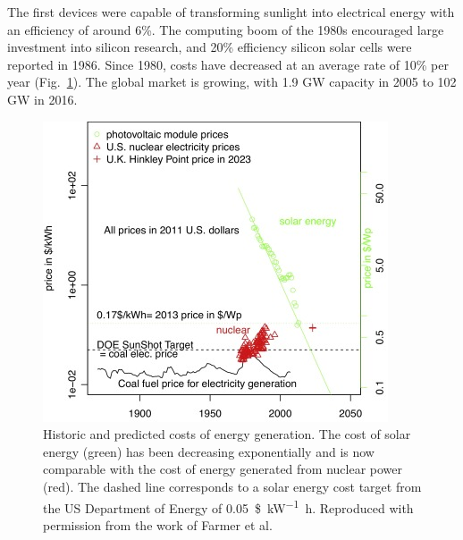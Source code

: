 The first devices were capable of transforming sunlight into electrical energy with an efficiency of around 6\%. The computing boom of the 1980s encouraged large investment into silicon research, and 20\% efficiency silicon solar cells were reported in 1986.\autocite{Blakers1986} Since 1980, costs have decreased at an average rate of 10\% per year\autocite{Farmer2016} (Fig.\ \ref{module_price}). The global market is growing, with 1.9 GW capacity in 2005 to 102 GW in 2016.\autocite{Jager-Waldau2017}

\begin{figure}[h]
\centering
  \includegraphics[width=0.7\columnwidth]{figures/ch1/solarcost.jpg}
  \caption[Historic and predicted costs of solar energy generation]{Historic and predicted costs of energy generation. The cost of solar energy (green) has been decreasing exponentially and is now comparable with the cost of energy generated from nuclear power (red). The dashed line corresponds to a  solar energy cost target from the US Department of Energy of \SI{0.05}{\$\per\kilo\watt\hour}. Reproduced with permission from the work of Farmer et al.\autocite{Farmer2016}}
  \label{module_price}
\end{figure}

